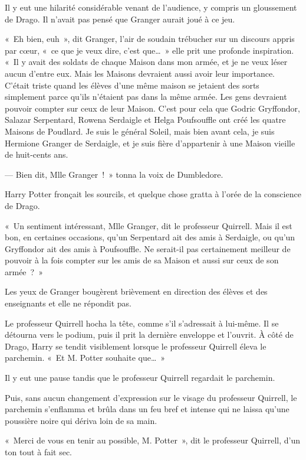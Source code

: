Il y eut une hilarité considérable venant de l'audience, y compris un gloussement de Drago.
Il n'avait pas pensé que Granger aurait joué à ce jeu.

«~Eh bien, euh~», dit Granger, l'air de soudain trébucher sur un discours appris par cœur, «~ce que je veux dire, c'est que…~»
elle prit une profonde inspiration.
«~Il y avait des soldats de chaque Maison dans mon armée, et je ne veux léser aucun d'entre eux.
Mais les Maisons devraient aussi avoir leur importance.
C'était triste quand les élèves d'une même maison se jetaient des sorts simplement parce qu'ils n'étaient pas dans la même armée.
Les gens devraient pouvoir compter sur ceux de leur Maison.
C'est pour cela que Godric Gryffondor, Salazar Serpentard, Rowena Serdaigle et Helga Poufsouffle ont créé les quatre Maisons de Poudlard.
Je suis le général Soleil, mais bien avant cela, je suis Hermione Granger de Serdaigle, et je suis fière d'appartenir à une Maison vieille de huit-cents ans.

--- Bien dit, Mlle Granger~!~»
 tonna la voix de Dumbledore.

Harry Potter fronçait les sourcils, et quelque chose gratta à l'orée de la conscience de Drago.

«~Un sentiment intéressant, Mlle Granger, dit le professeur Quirrell.
Mais il est bon, en certaines occasions, qu'un Serpentard ait des amis à Serdaigle, ou qu'un Gryffondor ait des amis à Poufsouffle.
Ne serait-il pas certainement meilleur de pouvoir à la fois compter sur les amis de sa Maison et aussi sur ceux de son armée~?~»

Les yeux de Granger bougèrent brièvement en direction des élèves et des enseignants et elle ne répondit pas.

Le professeur Quirrell hocha la tête, comme s'il s'adressait à lui-même.
Il se détourna vers le podium, puis il prit la dernière enveloppe et l'ouvrit.
À côté de Drago, Harry se tendit visiblement lorsque le professeur Quirrell éleva le parchemin.
«~Et M. Potter souhaite que…~»

Il y eut une pause tandis que le professeur Quirrell regardait le parchemin.

Puis, sans aucun changement d'expression sur le visage du professeur Quirrell, le parchemin s'enflamma et brûla dans un feu bref et intense qui ne laissa qu'une poussière noire qui dériva loin de sa main.

«~Merci de vous en tenir au possible, M. Potter~», dit le professeur Quirrell, d'un ton tout à fait sec.

